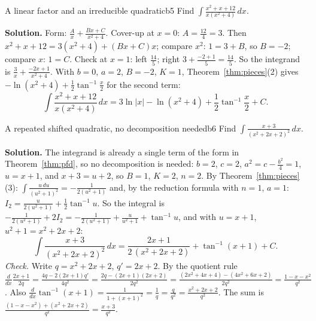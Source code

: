 \documentclass[11pt]{article}
\begin{document}
\begin{exmp}{A linear factor and an irreducible quadratic}{b5}
Find $\displaystyle\int\frac{x^2+x+12}{x(x^2+4)}\,dx$.

\textbf{Solution.} Form: $\frac Ax+\frac{Bx+C}{x^2+4}$. Cover-up at $x=0$: $A=\frac{12}4=3$. Then $x^2+x+12=3(x^2+4)+(Bx+C)x$; compare $x^2$: $1=3+B$, so $B=-2$; compare $x$: $1=C$. Check at $x=1$: left $\frac{14}5$; right $3+\frac{-2+1}5=\frac{14}5$. So the integrand is $\frac3x+\frac{-2x+1}{x^2+4}$. With $b=0$, $a=2$, $B=-2$, $K=1$, Theorem~\ref{thm:pieces}(2) gives $-\ln(x^2+4)+\frac12\tan^{-1}\frac x2$ for the second term:
\[\int\frac{x^2+x+12}{x(x^2+4)}\,dx=3\ln\lvert x\rvert-\ln\left(x^2+4\right)+\frac12\tan^{-1}\frac x2+C .\]
\end{exmp}

\begin{exmp}{A repeated shifted quadratic, no decomposition needed}{b6}
Find $\displaystyle\int\frac{x+3}{(x^2+2x+2)^2}\,dx$.

\textbf{Solution.} The integrand is already a single term of the form in Theorem~\ref{thm:pfd}, so no decomposition is needed: $b=2$, $c=2$, $a^2=c-\frac{b^2}4=1$, $u=x+1$, and $x+3=u+2$, so $B=1$, $K=2$, $n=2$. By Theorem~\ref{thm:pieces}(3): $\int\frac{u\,du}{(u^2+1)^2}=-\frac1{2(u^2+1)}$ and, by the reduction formula with $n=1$, $a=1$: $I_2=\frac u{2(u^2+1)}+\frac12\tan^{-1}u$. So the integral is $-\frac1{2(u^2+1)}+2I_2=-\frac1{2(u^2+1)}+\frac u{u^2+1}+\tan^{-1}u$, and with $u=x+1$, $u^2+1=x^2+2x+2$:
\[\int\frac{x+3}{(x^2+2x+2)^2}\,dx=\frac{2x+1}{2\,(x^2+2x+2)}+\tan^{-1}(x+1)+C .\]
\emph{Check.} Write $q=x^2+2x+2$, $q'=2x+2$. By the quotient rule $\frac d{dx}\frac{2x+1}{2q}=\frac{4q-2(2x+1)q'}{4q^2}=\frac{2q-(2x+1)(2x+2)}{2q^2}=\frac{(2x^2+4x+4)-(4x^2+6x+2)}{2q^2}=\frac{1-x-x^2}{q^2}$. Also $\frac d{dx}\tan^{-1}(x+1)=\frac1{1+(x+1)^2}=\frac1q=\frac{q}{q^2}=\frac{x^2+2x+2}{q^2}$. The sum is $\frac{(1-x-x^2)+(x^2+2x+2)}{q^2}=\frac{x+3}{q^2}$.
\end{exmp}
\end{document}
